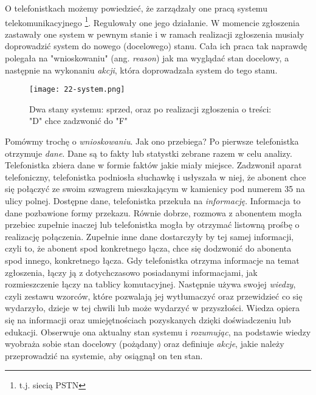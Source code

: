 O telefonistkach możemy powiedzieć, że zarządzały one pracą systemu telekomunikacyjnego \footnote{t.j. siecią PSTN}. Regulowały one jego działanie. W momencie zgłoszenia zastawały one system w pewnym stanie i w ramach realizacji zgłoszenia musiały doprowadzić system do nowego (docelowego) stanu. Cała ich praca tak naprawdę polegała na "wnioskowaniu" (ang. \textit{reason}) jak ma wyglądać stan docelowy, a następnie na wykonaniu \textit{akcji}, która doprowadzała system do tego stanu. 

\begin{figure}[!htbp]
    \centering \texttt{[image: 22-system.png]}
    \caption{Dwa stany systemu: sprzed, oraz po realizacji zgłoszenia o treści: "D" chce zadzwonić do "F"}\label{fig:}
\end{figure}

Pomówmy trochę o \textit{wnioskowaniu}. Jak ono przebiega? Po pierwsze telefonistka otrzymuje \textit{dane}. Dane są to fakty lub statystki zebrane razem w celu analizy. Telefonistka zbiera dane w formie faktów jakie miały miejsce. Zadzwonił aparat telefoniczny, telefonistka podniosła słuchawkę i usłyszała w niej, że abonent chce się połączyć ze swoim szwagrem mieszkającym w kamienicy pod numerem 35 na ulicy polnej. Dostępne dane, telefonistka przekuła na \textit{informację}. Informacja to dane pozbawione formy przekazu. Równie dobrze, rozmowa z abonentem mogła przebiec zupełnie inaczej lub telefonistka mogła by otrzymać listowną prośbę o realizację połączenia. Zupełnie inne dane dostarczyły by tej samej informacji, czyli to, że abonent spod konkretnego łącza, chce się dodzwonić do abonenta spod innego, konkretnego łącza. Gdy telefonistka otrzyma informacje na temat zgłoszenia, łączy ją z dotychczasowo posiadanymi informacjami, jak rozmieszczenie łączy na tablicy komutacyjnej. Następnie używa swojej \textit{wiedzy}, czyli zestawu wzorców, które pozwalają jej wytłumaczyć oraz przewidzieć co się wydarzyło, dzieje w tej chwili lub może wydarzyć w przyszłości. Wiedza opiera się na informacji oraz umiejętnościach pozyskanych dzięki doświadczeniu lub edukacji.  Obserwuje ona aktualny stan systemu i \textit{rozumując}, na podstawie wiedzy wyobraża sobie stan docelowy (pożądany) oraz definiuje \textit{akcje}, jakie należy przeprowadzić na systemie, aby osiągnął on ten stan. 


